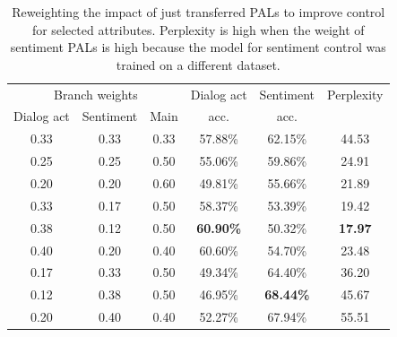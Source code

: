 \documentclass[11pt]{article}
\begin{document}
\begin{table}[ht]
\fontsize{9}{11}
\selectfont 
\centering
\begin{tabular}{cccccc}
\hline
\multicolumn{3}{c}{Branch weights} & Dialog act & Sentiment & Perplexity \\
Dialog act   & Sentiment & Main  & acc.       & acc.      &            \\ \hline
0.33          & 0.33       & 0.33   & 57.88\%    & 62.15\%   & 44.53      \\
0.25          & 0.25       & 0.50   & 55.06\%    & 59.86\%   & 24.91      \\
0.20          & 0.20       & 0.60   & 49.81\%    & 55.66\%   & 21.89      \\ \hline
0.33          & 0.17       & 0.50   & 58.37\%    & 53.39\%   & 19.42      \\
0.38          & 0.12       & 0.50   & \textbf{60.90\%}    & 50.32\%   & \textbf{17.97}      \\
0.40          & 0.20       & 0.40   & 60.60\%    & 54.70\%   & 23.48      \\ \hline
0.17          & 0.33       & 0.50   & 49.34\%    & 64.40\%   & 36.20      \\
0.12          & 0.38       & 0.50   & 46.95\%    & \textbf{68.44\%}   & 45.67      \\
0.20          & 0.40       & 0.40   & 52.27\%    & 67.94\%   & 55.51      \\\hline
\end{tabular}
\caption{Reweighting the impact of just transferred PALs to improve control for selected attributes. Perplexity is high when the weight of sentiment PALs is high because the model for sentiment control was trained on a different dataset.}
\label{reweighting_just_transfered}
\end{table}
\end{document}
